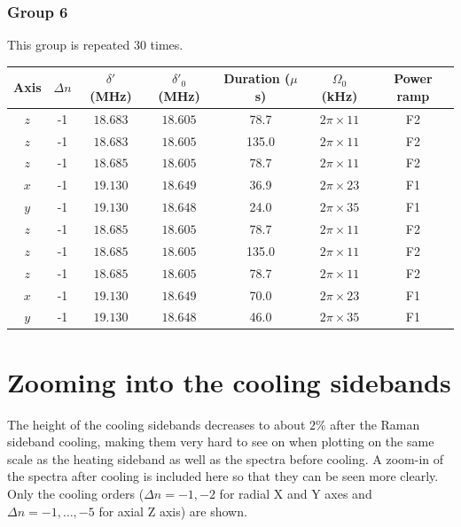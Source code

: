 \documentclass[aps,secnumarabic,amsmath,amssymb]{revtex4}
\begin{document}
\subsubsection{Group 6}
This group is repeated 30 times.
\begin{center}
  \begin{tabular}{|c|c|c|c|c|c|c|}
    \hline
    Axis&$\Delta n$&$\delta'$ (MHz)&$\delta'_0$ (MHz)&Duration ($\mu$s)& $\Omega_0$ (kHz)&Power ramp\\\hline
    $z$&-1&$18.683$&$18.605$&78.7&$2\pi\times11$&F2\\\hline
    $z$&-1&$18.683$&$18.605$&135.0&$2\pi\times11$&F2\\\hline
    $z$&-1&$18.685$&$18.605$&78.7&$2\pi\times11$&F2\\\hline
    $x$&-1&$19.130$&$18.649$&36.9&$2\pi\times23$&F1\\\hline
    $y$&-1&$19.130$&$18.648$&24.0&$2\pi\times35$&F1\\\hline
    $z$&-1&$18.685$&$18.605$&78.7&$2\pi\times11$&F2\\\hline
    $z$&-1&$18.685$&$18.605$&135.0&$2\pi\times11$&F2\\\hline
    $z$&-1&$18.685$&$18.605$&78.7&$2\pi\times11$&F2\\\hline
    $x$&-1&$19.130$&$18.649$&70.0&$2\pi\times23$&F1\\\hline
    $y$&-1&$19.130$&$18.648$&46.0&$2\pi\times35$&F1\\\hline
  \end{tabular}
\end{center}

\section{Zooming into the cooling sidebands}
The height of the cooling sidebands decreases to about $2\%$ after the Raman sideband cooling,
making them very hard to see on when plotting on the same scale as the heating sideband
as well as the spectra before cooling. A zoom-in of the spectra after cooling
is included here so that they can be seen more clearly.
Only the cooling orders ($\Delta n=-1,-2$ for radial X and Y axes and $\Delta n=-1, \dots, -5$ for axial Z axis) are shown.
\end{document}
